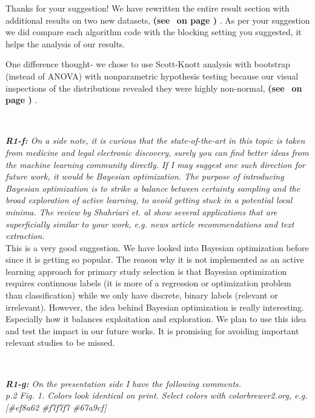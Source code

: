 \documentclass{svjour3}
\theoremstyle{break}
\newcommand{\review}[1]{{\textit{#1}}~\\}
\newcommand{\citeresp}[1]{
{\bf (see } \fcolorbox{black}{black!15}{
 \bf
  \scriptsize R-{#1}}~{\bf{on page \pageref{response:#1})}}
}
\begin{document}
Thanks for your suggestion! We have rewritten the entire result section with additional results on two new datasets, \citeresp{1e1}. As per your suggestion we did compare each algorithm code with the blocking setting you suggested, it helps the analysis of our results.

One difference thought-
we chose to use Scott-Knott analysis with bootstrap (instead of ANOVA) with nonparametric hypothesis testing because our
visual inspections of the distributions revealed they were highly non-normal, \citeresp{1e2}. 
\par ~


\review{\textbf{R1-f:} On a side note, it is curious that the state-of-the-art in this topic is taken from medicine and legal electronic discovery, surely you can find better ideas from the machine learning community directly. If I may suggest one such direction for future work, it would be Bayesian optimization. The purpose of introducing Bayesian optimization is to strike a balance between certainty sampling and the broad exploration of active learning, to avoid getting stuck in a potential local minima. The review by Shahriari et. al show several applications that are superficially similar to your work, e.g. news article recommendations and text extraction.}

This is a very good suggestion. We have looked into Bayesian optimization before since it is getting so popular. The reason why it is not implemented as an active learning approach for primary study selection is that Bayesian optimization requires continuous labels (it is more of a regression or optimization problem than classification) while we only have discrete, binary labels (relevant or irrelevant). However, the idea behind Bayesian optimization is really interesting. Especially how it balances exploitation and exploration. We plan to use this  idea and test the impact in our future works. It is promising for avoiding important relevant studies to be missed. 

\par ~


\review{\textbf{R1-g:} On the presentation side I have the following comments.}

\review{p.2 Fig. 1. Colors look identical on print. Select colors with colorbrewer2.org, e.g. [\#ef8a62 \#f7f7f7 \#67a9cf]}
\end{document}
